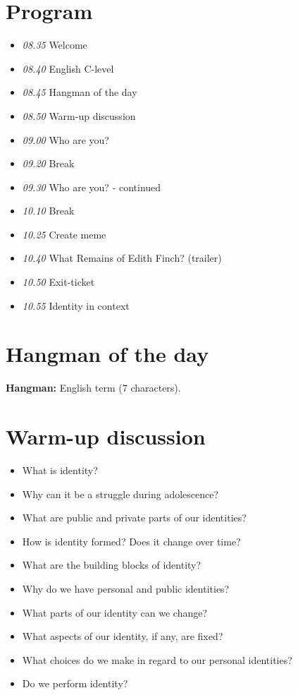 \documentclass[11pt,a4paper,oneside]{book}
\begin{document}
\section*{Program}

\begin{itemize}
\item \emph{08.35} Welcome
\item \emph{08.40} English C-level
\item \emph{08.45} Hangman of the day
\item \emph{08.50} Warm-up discussion
\item \emph{09.00} Who are you?
\item \emph{09.20} Break
\item \emph{09.30} Who are you? - continued
\item \emph{10.10} Break
\item \emph{10.25} Create meme
\item \emph{10.40} What Remains of Edith Finch? (trailer)
\item \emph{10.50} Exit-ticket
\item \emph{10.55} Identity in context
\end{itemize}

\section*{Hangman of the day}
\textbf{Hangman:} English term (7 characters).\par\medskip

\section*{Warm-up discussion}

\begin{itemize}
\item What is identity?
\item Why can it be a struggle during adolescence?
\item What are public and private parts of our identities?
\item How is identity formed?
Does it change over time?
\item What are the building blocks of identity?
\item Why do we have personal and public identities?
\item What parts of our identity can we change?
\item What aspects of our identity, if any, are fixed?
\item What choices do we make in regard to our personal identities?
\item Do we perform identity?
\end{itemize}
\end{document}
